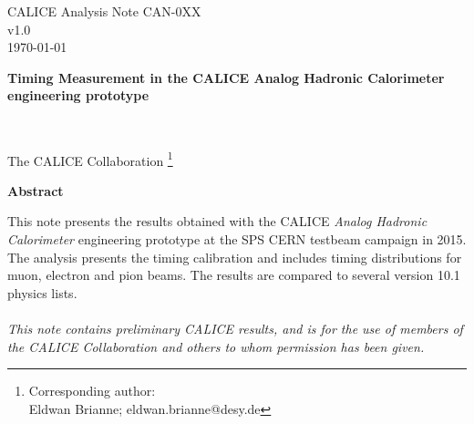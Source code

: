 \begin{titlepage}
\begin{flushright}
CALICE Analysis Note CAN-0XX\\
v1.0\\
\today\\
\end{flushright}

\begin{center}
\vspace*{\fill}
\begin{LARGE} \textbf{Timing Measurement in the CALICE Analog Hadronic Calorimeter engineering prototype} \end{LARGE} \\ [10ex]
\begin{Large} The CALICE Collaboration \footnote{Corresponding author: \\ Eldwan Brianne; eldwan.brianne@desy.de}\\ [10ex]
\end{Large}

\begin{large}
\textbf{Abstract} \\
\end{large}
\end{center}
This note presents the results obtained with the CALICE \emph{Analog Hadronic Calorimeter} engineering prototype at the SPS CERN testbeam campaign in 2015. The analysis presents the timing calibration and includes timing distributions for muon, electron and pion beams. The results are compared to several \geant version 10.1 physics lists.\\
\\

\textit{
This note contains preliminary CALICE results, and is for the use of members of the CALICE Collaboration and others to whom permission has been given.}

\end{titlepage}
